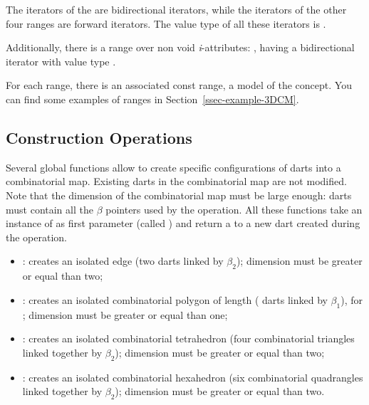 The iterators of the  are bidirectional iterators, 
while the iterators of the other four ranges are forward iterators. 
The value type of all these iterators is .

Additionally, there is a range over non void \emph{i}-attributes:
, having a bidirectional iterator with
value type .

For each range, there is an associated const range, a model of the
 concept.  You can find some examples of ranges in
Section~\ref{ssec-example-3DCM}.

\subsection{Construction Operations}\label{ssec-construction}

Several global functions allow to create specific configurations of
darts into a combinatorial map. Existing darts in the combinatorial
map are not modified. Note that the dimension of the combinatorial map
must be large enough: darts must contain all the $\beta$ pointers used by the
operation. All these functions take an instance of
 as first parameter (called ) and return
a  to a new dart created during the operation.

\begin{itemize}
\item {}: creates an isolated edge (two darts
  linked by $\beta_2$); dimension must be greater or equal than two;
\item {}: creates an
  isolated combinatorial polygon of length  ( darts
  linked by $\beta_1$), for ; dimension must be greater
  or equal than one;
\item {}: creates an
  isolated combinatorial tetrahedron (four combinatorial triangles
  linked together by $\beta_2$); dimension must be greater or equal
  than two;
\item {}: creates an
  isolated combinatorial hexahedron (six combinatorial quadrangles
  linked together by $\beta_2$); dimension must be greater or equal
  than two.
\end{itemize}

